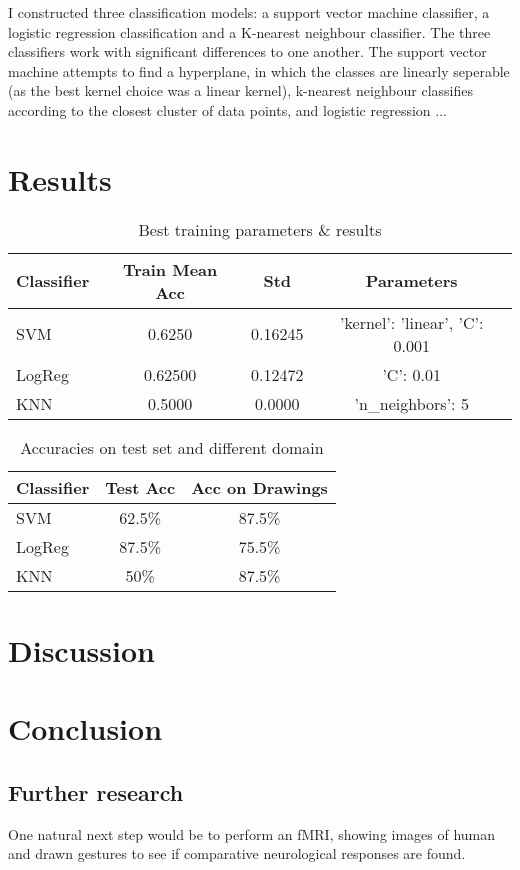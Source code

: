 \documentclass[10pt, a4paper]{article}
\begin{document}
I constructed three classification models: a support vector machine classifier, a logistic regression classification and a K-nearest neighbour classifier. The three classifiers work with significant differences to one another. The support vector machine attempts to find a hyperplane, in which the classes are linearly seperable (as the best kernel choice was a linear kernel), k-nearest neighbour classifies according to the closest cluster of data points, and logistic regression ...
\section{Results}

\begin{table}[h]
  \centering
  \small
  \setlength\tabcolsep{2pt}
    \begin{tabular}{l|ccc}
    Classifier & Train Mean Acc & Std     & Parameters                     \\\hline
    SVM        & 0.6250         & 0.16245 & 'kernel': 'linear', 'C': 0.001 \\
    LogReg     & 0.62500        & 0.12472 & 'C': 0.01                      \\
    KNN        & 0.5000         & 0.0000  & 'n\_neighbors': 5
    \end{tabular}
  \caption{Best training parameters \& results}
  \label{fig:TrainAcc}
\end{table}

\begin{table}[h]
  \centering
    \begin{tabular}{l|cc}
    Classifier & Test Acc & Acc on Drawings \\\hline
    SVM        & 62.5\%   & 87.5\%               \\
    LogReg     & 87.5\%   & 75.5\%               \\
    KNN        & 50\%     & 87.5\%
    \end{tabular}
  \caption{Accuracies on test set and different domain}
  \label{fig:testDomainAcc}
\end{table}
\section{Discussion}
\section{Conclusion}
\subsection{Further research}
One natural next step would be to perform an fMRI, showing images of human and drawn gestures to see if comparative neurological responses are found.
\clearpage


\nocite{*}
\end{document}
